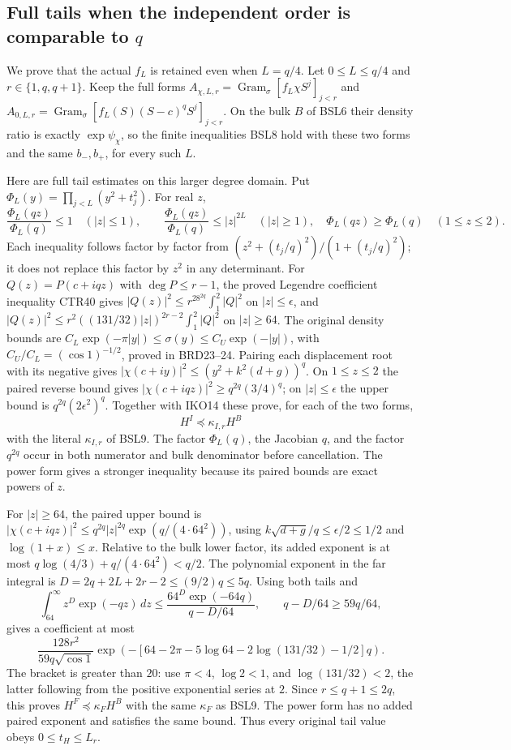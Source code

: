 \documentclass[11pt,a4paper]{article}
\begin{document}
\subsection{Full tails when the independent order is comparable to $q$}
We prove that the actual $f_L$ is retained even when $L=q/4$.
Let $0\leq L\leq q/4$ and $r\in\{1,q,q+1\}$. Keep the full forms
$A_{\chi,L,r}=\operatorname{Gram}_\sigma[f_L\chi S^j]_{j<r}$
and $A_{0,L,r}=\operatorname{Gram}_\sigma[f_L(S)(S-c)^qS^j]_{j<r}$.
On the bulk $B$ of BSL6 their density ratio is exactly
$\exp\psi_\chi$, so the finite inequalities BSL8 hold with these
two forms and the same $b_-,b_+$, for every such $L$.

Here are full tail estimates on this larger degree domain. Put
$\Phi_L(y)=\prod_{j<L}(y^2+t_j^2)$. For real $z$,
\[
 \frac{\Phi_L(qz)}{\Phi_L(q)}\leq1\quad(|z|\leq1),\qquad
 \frac{\Phi_L(qz)}{\Phi_L(q)}\leq|z|^{2L}\quad(|z|\geq1),
 \quad\Phi_L(qz)\geq\Phi_L(q)\quad(1\leq z\leq2).
 \tag{IKO14}
\]
Each inequality follows factor by factor from
$(z^2+(t_j/q)^2)/(1+(t_j/q)^2)$; it does not replace this factor
by $z^2$ in any determinant.
For $Q(z)=P(c+iqz)$ with $\deg P\leq r-1$, the proved Legendre
coefficient inequality CTR40 gives
$|Q(z)|^2\leq r^28^{2q}\int_1^2|Q|^2$ on $|z|\leq\epsilon$,
and $|Q(z)|^2\leq r^2((131/32)|z|)^{2r-2}\int_1^2|Q|^2$
on $|z|\geq64$. The original density bounds are
$C_L\exp(-\pi|y|)\leq\sigma(y)\leq C_U\exp(-|y|)$,
with $C_U/C_L=(\cos1)^{-1/2}$, proved in BRD23--24.
Pairing each displacement root with its negative gives
$|\chi(c+iy)|^2\leq(y^2+k^2(d+g))^q$.
On $1\leq z\leq2$ the paired reverse bound gives
$|\chi(c+iqz)|^2\geq q^{2q}(3/4)^q$; on $|z|\leq\epsilon$
the upper bound is $q^{2q}(2\epsilon^2)^q$.
Together with IKO14 these prove, for each of the two forms,
\[
 H^I\preceq\kappa_{I,r}H^B
 \tag{IKO15}
\]
with the literal $\kappa_{I,r}$ of BSL9. The factor
$\Phi_L(q)$, the Jacobian $q$, and the factor $q^{2q}$ occur in
both numerator and bulk denominator before cancellation. The power
form gives a stronger inequality because its paired bounds are exact
powers of $z$.

For $|z|\geq64$, the paired upper bound is
$|\chi(c+iqz)|^2\leq q^{2q}|z|^{2q}\exp(q/(4\cdot64^2))$,
using $k\sqrt{d+g}/q\leq\epsilon/2\leq1/2$ and
$\log(1+x)\leq x$. Relative to the bulk lower factor, its added
exponent is at most
$q\log(4/3)+q/(4\cdot64^2)<q/2$.
The polynomial exponent in the far integral is
$D=2q+2L+2r-2\leq(9/2)q\leq5q$.
Using both tails and
\[
 \int_{64}^{\infty}z^D\exp(-qz)\,dz
 \leq\frac{64^D\exp(-64q)}{q-D/64},\qquad q-D/64\geq59q/64,
\]
gives a coefficient at most
\[
 \frac{128r^2}{59q\sqrt{\cos1}}
 \exp\left(-[64-2\pi-5\log64-2\log(131/32)-1/2]q\right).
\]
The bracket is greater than $20$: use $\pi<4$, $\log2<1$,
and $\log(131/32)<2$, the latter following from the positive
exponential series at $2$. Since $r\leq q+1\leq2q$, this proves
$H^F\preceq\kappa_FH^B$ with the same $\kappa_F$ as BSL9.
The power form has no added paired exponent and satisfies the same
bound. Thus every original tail value obeys $0\leq t_H\leq L_r$.
\end{document}
